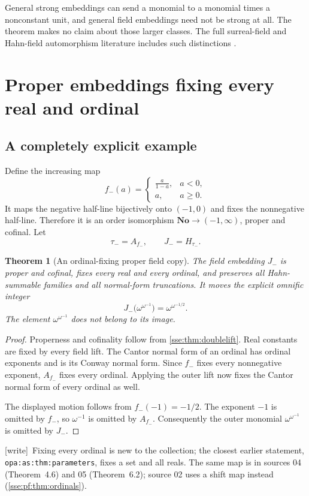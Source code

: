 \documentclass[11pt,a4paper]{article}
\numberwithin{equation}{section}
\theoremstyle{plain}
\newtheorem{theorem}{Theorem}[section]
\theoremstyle{definition}
\theoremstyle{remark}
\newcommand{\No}{\mathbf{No}}
\newcommand{\lbl}[1]{\nolinkurl{#1}}%
\newcommand{\wtag}{\textup{\textsf{[write]}}}%
\newenvironment{wnote}{\par\smallskip\noindent\wtag\ }{\par\smallskip}
\begin{document}
General strong embeddings can send a monomial to a monomial times a
nonconstant unit, and general field embeddings need not be strong at all.
The theorem makes no claim about those larger classes. The full
surreal-field and Hahn-field automorphism literature includes such distinctions
\cite{KKS,KS}.

\section{Proper embeddings fixing every real and ordinal}\label{sse:sec:stabilizers}

\subsection{A completely explicit example}
Define the increasing map
\begin{equation}\label{sse:eq:fminus}
 f_-(a)=
 \begin{cases}
 \displaystyle\frac{a}{1-a},&a<0,\\[2mm]
 a,&a\ge0.
 \end{cases}
\end{equation}
It maps the negative half-line bijectively onto $(-1,0)$ and fixes the
nonnegative half-line. Therefore it is an order isomorphism
$\No\to(-1,\infty)$, proper and cofinal. Let
\[
 \tau_-=A_{f_-},\qquad J_-=H_{\tau_-}.
\]

\begin{theorem}[An ordinal-fixing proper field copy]\label{sse:thm:explicit}
The field embedding $J_-$ is proper and cofinal, fixes every real and every
ordinal, and preserves all Hahn-summable families and all normal-form
truncations. It moves the explicit omnific integer
\[
 J_-\bigl(\omega^{\omega^{-1}}\bigr)
     =\omega^{\omega^{-1/2}}.
\]
The element $\omega^{\omega^{-1}}$ does not belong to its image.
\end{theorem}
\begin{proof}
Properness and cofinality follow from \cref{sse:thm:doublelift}. Real constants
are fixed by every field lift. The Cantor normal form of an ordinal has
ordinal exponents and is its Conway normal form. Since $f_-$ fixes every
nonnegative exponent, $A_{f_-}$ fixes every ordinal. Applying the outer
lift now fixes the Cantor normal form of every ordinal as well.

The displayed motion follows from $f_-(-1)=-1/2$. The exponent $-1$ is
omitted by $f_-$, so $\omega^{-1}$ is omitted by $A_{f_-}$. Consequently the
outer monomial $\omega^{\omega^{-1}}$ is omitted by $J_-$.
\end{proof}
\begin{wnote}Fixing every ordinal is new to the collection; the closest earlier statement, \lbl{opa:as:thm:parameters}, fixes a set and all reals. The same map is in sources 04 (Theorem~4.6) and 05 (Theorem~6.2); source 02 uses a shift map instead (\cref{sse:pf:thm:ordinals}).\end{wnote}
\end{document}

